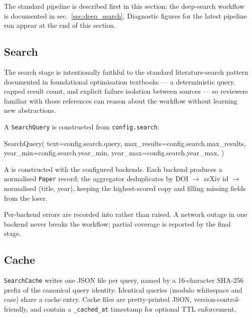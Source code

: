 \documentclass[
  english,
]{article}
\newenvironment{Shaded}{}{}
\newcommand{\NormalTok}[1]{#1}
\newcommand{\OperatorTok}[1]{\textcolor[rgb]{0.40,0.40,0.40}{#1}}
\begin{document}
The standard pipeline is described first in this section; the
deep-search workflow is documented in sec.~\ref{sec:deep_search}.
Diagnostic figures for the latest pipeline run appear at the end of this
section.

\subsection{Search}\label{search}

The search stage is intentionally faithful to the standard
literature-search pattern documented in foundational optimisation
textbooks \citep{boyd2004convex, nocedal2006numerical} --- a
deterministic query, capped result count, and explicit failure isolation
between sources --- so reviewers familiar with those references can
reason about the workflow without learning new abstractions.

A \texttt{SearchQuery} is constructed from \texttt{config.search}:

\begin{Shaded}
\begin{Highlighting}[]
\NormalTok{SearchQuery(}
\NormalTok{    text}\OperatorTok{=}\NormalTok{config.search.query,}
\NormalTok{    max\_results}\OperatorTok{=}\NormalTok{config.search.max\_results,}
\NormalTok{    year\_min}\OperatorTok{=}\NormalTok{config.search.year\_min,}
\NormalTok{    year\_max}\OperatorTok{=}\NormalTok{config.search.year\_max,}
\NormalTok{)}
\end{Highlighting}
\end{Shaded}

A  is constructed with the configured backends.
Each backend produces a normalised \texttt{Paper} record; the aggregator
deduplicates by DOI \texorpdfstring{\ensuremath{\to}}{->} arXiv id \texorpdfstring{\ensuremath{\to}}{->} normalised (title, year), keeping the
highest-scored copy and filling missing fields from the loser.

Per-backend errors are recorded into  rather
than raised. A network outage in one backend never breaks the workflow;
partial coverage is reported by the final stage.

\subsection{Cache}\label{cache}

\texttt{SearchCache} writes one JSON file per query, named by a
16-character SHA-256 prefix of the canonical query identity. Identical
queries (modulo whitespace and case) share a cache entry. Cache files
are pretty-printed JSON, version-control-friendly, and contain a
\texttt{\_cached\_at} timestamp for optional TTL enforcement.
\end{document}
